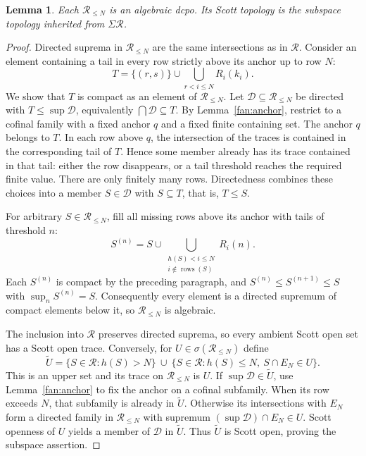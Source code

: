 \documentclass[fleqn,preprint,3p,a4paper]{elsarticle}
\newtheorem{lemma}[theorem]{Lemma}
\theoremstyle{definition}
\newcommand{\RR}{\mathcal R}
\newcommand{\rows}{\operatorname{rows}}
\begin{document}
\begin{lemma}\label{fan:truncations}
Each $\RR_{\leq N}$ is an algebraic dcpo. Its Scott topology is the subspace topology inherited from $\Sigma\RR$.
\end{lemma}
\begin{proof}
Directed suprema in $\RR_{\leq N}$ are the same intersections as in $\RR$. Consider an element containing a tail in every row strictly above its anchor up to row $N$:
\[
 T=\{(r,s)\}\cup\bigcup_{r<i\leq N}R_i(k_i).
\]
We show that $T$ is compact as an element of $\RR_{\leq N}$. Let $\mathcal D\subseteq\RR_{\leq N}$ be directed with $T\leq\sup\mathcal D$, equivalently $\bigcap\mathcal D\subseteq T$. By Lemma~\ref{fan:anchor}, restrict to a cofinal family with a fixed anchor $q$ and a fixed finite containing set. The anchor $q$ belongs to $T$. In each row above $q$, the intersection of the traces is contained in the corresponding tail of $T$. Hence some member already has its trace contained in that tail: either the row disappears, or a tail threshold reaches the required finite value. There are only finitely many rows. Directedness combines these choices into a member $S\in\mathcal D$ with $S\subseteq T$, that is, $T\leq S$.

For arbitrary $S\in\RR_{\leq N}$, fill all missing rows above its anchor with tails of threshold $n$:
\[
 S^{(n)}=S\cup
 \bigcup_{\substack{h(S)<i\leq N\\i\notin\rows(S)}}R_i(n).
\]
Each $S^{(n)}$ is compact by the preceding paragraph, and $S^{(n)}\leq S^{(n+1)}\leq S$ with $\sup_n S^{(n)}=S$. Consequently every element is a directed supremum of compact elements below it, so $\RR_{\leq N}$ is algebraic.

The inclusion into $\RR$ preserves directed suprema, so every ambient Scott open set has a Scott open trace. Conversely, for $U\in\sigma(\RR_{\leq N})$ define
\[
 \widetilde U
 =\{S\in\RR:h(S)>N\}
 \ \cup\
 \{S\in\RR:h(S)\leq N,\ S\cap E_N\in U\}.
\]
This is an upper set and its trace on $\RR_{\leq N}$ is $U$. If $\sup\mathcal D\in\widetilde U$, use Lemma~\ref{fan:anchor} to fix the anchor on a cofinal subfamily. When its row exceeds $N$, that subfamily is already in $\widetilde U$. Otherwise its intersections with $E_N$ form a directed family in $\RR_{\leq N}$ with supremum $(\sup\mathcal D)\cap E_N\in U$. Scott openness of $U$ yields a member of $\mathcal D$ in $\widetilde U$. Thus $\widetilde U$ is Scott open, proving the subspace assertion.
\end{proof}
\end{document}
